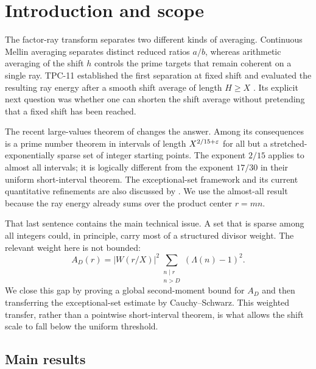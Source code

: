 \section{Introduction and scope}
\label{sec:introduction}

The factor-ray transform separates two different kinds of averaging.
Continuous Mellin averaging separates distinct reduced ratios $a/b$,
whereas arithmetic averaging of the shift $h$ controls the prime targets
that remain coherent on a single ray.  TPC-11 established the first
separation at fixed shift and evaluated the resulting ray energy after a
smooth shift average of length $H\geq X$ \citep{WangTPC11}.  Its explicit
next question was whether one can shorten the shift average without
pretending that a fixed shift has been reached.

The recent large-values theorem of \citet{GuthMaynard2026} changes the
answer.  Among its consequences is a prime number theorem in intervals of
length $X^{2/15+\varepsilon}$ for all but a stretched-exponentially sparse set of
integer starting points.  The exponent $2/15$ applies to almost all
intervals; it is logically different from the exponent $17/30$ in their
uniform short-interval theorem.  The exceptional-set framework and its
current quantitative refinements are also discussed by
\citet{GafniTao2026}.  We use the almost-all result because the ray energy
already sums over the product center $r=mn$.

That last sentence contains the main technical issue.  A set that is
sparse among all integers could, in principle, carry most of a structured
divisor weight.  The relevant weight here is not bounded:
\[
 A_D(r)=|W(r/X)|^2
 \sum_{\substack{n\mid r\\n>D}}(\Lambda(n)-1)^2.
\]
We close this gap by proving a global second-moment bound for $A_D$ and
then transferring the exceptional-set estimate by Cauchy--Schwarz.  This
weighted transfer, rather than a pointwise short-interval theorem, is what
allows the shift scale to fall below the uniform threshold.

\subsection{Main results}


